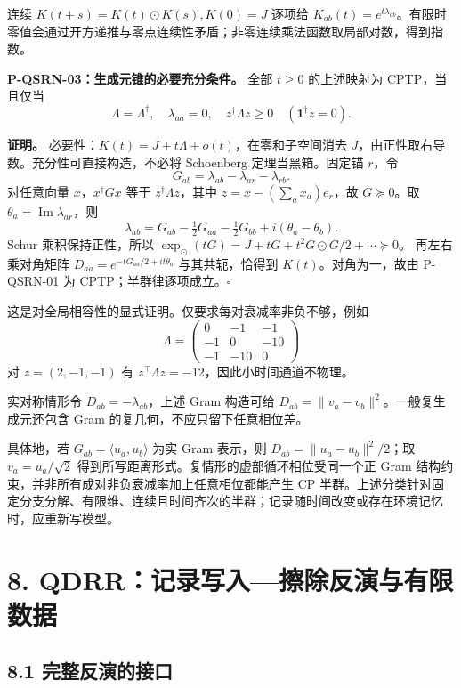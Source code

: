 \documentclass[
  11pt,
  oneside]{book}
\begin{document}
连续 \(K(t+s)=K(t)\odot K(s),K(0)=J\) 逐项给
\(K_{ab}(t)=e^{t\lambda_{ab}}\)。有限时零值会通过开方递推与零点连续性矛盾；非零连续乘法函数取局部对数，得到指数。

\protect\hypertarget{p-qsrn-03}{}{}

\textbf{P-QSRN-03：生成元锥的必要充分条件。} 全部 \(t\ge0\) 的上述映射为
CPTP，当且仅当 \[
\Lambda=\Lambda^\dagger,\quad\lambda_{aa}=0,\quad
z^\dagger\Lambda z\ge0\quad(\mathbf1^\dagger z=0).
\]

\textbf{证明。} 必要性：\(K(t)=J+t\Lambda+o(t)\)，在零和子空间消去
\(J\)，由正性取右导数。充分性可直接构造，不必将 Schoenberg
定理当黑箱。固定锚 \(r\)，令 \[
G_{ab}=\lambda_{ab}-\lambda_{ar}-\lambda_{rb}.
\] 对任意向量 \(x\)，\(x^\dagger Gx\) 等于 \(z^\dagger\Lambda z\)，其中
\(z=x-(\sum_ax_a)e_r\)，故 \(G\succeq0\)。取
\(\theta_a=\operatorname{Im}\lambda_{ar}\)，则 \[
\lambda_{ab}=G_{ab}-\tfrac12G_{aa}-\tfrac12G_{bb}
+i(\theta_a-\theta_b).
\] Schur 乘积保持正性，所以
\(\exp_\odot(tG)=J+tG+t^2G\odot G/2+\cdots\succeq0\)。 再左右乘对角矩阵
\(D_{aa}=e^{-tG_{aa}/2+it\theta_a}\) 与其共轭，恰得到
\(K(t)\)。对角为一，故由 P-QSRN-01 为 CPTP；半群律逐项成立。\(\square\)

这是对全局相容性的显式证明。仅要求每对衰减率非负不够，例如 \[
\Lambda=\begin{pmatrix}0&-1&-1\\-1&0&-10\\-1&-10&0\end{pmatrix}
\] 对 \(z=(2,-1,-1)\) 有 \(z^\top\Lambda z=-12\)，因此小时间通道不物理。

实对称情形令 \(D_{ab}=-\lambda_{ab}\)，上述 Gram 构造可给
\(D_{ab}=\|v_a-v_b\|^2\)。一般复生成元还包含 Gram
的复几何，不应只留下任意相位差。

具体地，若 \(G_{ab}=\langle u_a,u_b\rangle\) 为实 Gram 表示，则
\(D_{ab}=\|u_a-u_b\|^2/2\)；取 \(v_a=u_a/\sqrt2\)
得到所写距离形式。复情形的虚部循环相位受同一个正 Gram
结构约束，并非所有成对非负衰减率加上任意相位都能产生 CP
半群。上述分类针对固定分支分解、有限维、连续且时间齐次的半群；记录随时间改变或存在环境记忆时，应重新写模型。

\hypertarget{ch-8}{%
\chapter{8. QDRR：记录写入---擦除反演与有限数据}\label{ch-8}}

\hypertarget{ux5b8cux6574ux53cdux6f14ux7684ux63a5ux53e3}{%
\section{8.1
完整反演的接口}\label{ux5b8cux6574ux53cdux6f14ux7684ux63a5ux53e3}}
\end{document}
